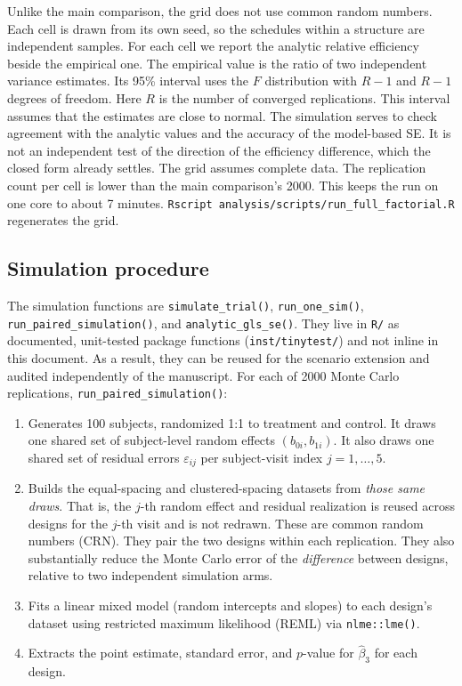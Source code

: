 \documentclass[
  11pt,
]{article}
\providecommand{\tightlist}{%
  \setlength{\itemsep}{0pt}\setlength{\parskip}{0pt}}
\begin{document}
Unlike the main comparison, the grid does not use common random
numbers. Each cell is drawn from its own seed, so the schedules
within a structure are independent samples. For each cell we
report the analytic relative efficiency beside the empirical one.
The empirical value is the ratio of two independent variance
estimates. Its 95\% interval uses the \(F\) distribution with
\(R - 1\) and \(R - 1\) degrees of freedom. Here \(R\) is the number of
converged replications. This interval assumes that the estimates
are close to normal. The simulation serves to check agreement
with the analytic values and the accuracy of the model-based SE.
It is not an independent test of the direction of the efficiency
difference, which the closed form already settles. The grid
assumes complete data. The replication count per cell is lower
than the main comparison's 2000. This keeps the run on one
core to about
7
minutes. \texttt{Rscript\ analysis/scripts/run\_full\_factorial.R}
regenerates the grid.

\subsection{Simulation procedure}\label{simulation-procedure}

The simulation functions are \texttt{simulate\_trial()}, \texttt{run\_one\_sim()},
\texttt{run\_paired\_simulation()}, and \texttt{analytic\_gls\_se()}. They live in
\texttt{R/} as documented, unit-tested package functions
(\texttt{inst/tinytest/}) and not inline in this document. As a result,
they can be reused for the scenario extension and audited
independently of the manuscript.
For each of 2000 Monte Carlo replications,
\texttt{run\_paired\_simulation()}:

\begin{enumerate}
\def\labelenumi{\arabic{enumi}.}
\tightlist
\item
  Generates 100 subjects, randomized 1:1 to treatment
  and control. It draws one shared set of subject-level random
  effects \((b_{0i}, b_{1i})\). It also draws one shared set of
  residual errors \(\varepsilon_{ij}\) per subject-visit index
  \(j = 1, \dots, 5\).
\item
  Builds the equal-spacing and clustered-spacing datasets from
  \emph{those same draws}. That is, the \(j\)-th random effect and
  residual realization is reused across designs for the \(j\)-th
  visit and is not redrawn. These are common random numbers
  (CRN). They pair the two designs within each replication. They
  also substantially reduce the Monte Carlo error of the
  \emph{difference} between designs, relative to two independent
  simulation arms.
\item
  Fits a linear mixed model (random intercepts and slopes) to each
  design's dataset using restricted maximum likelihood (REML) via
  \texttt{nlme::lme()}.
\item
  Extracts the point estimate, standard error, and \(p\)-value for
  \(\hat{\beta}_3\) for each design.
\end{enumerate}
\end{document}
